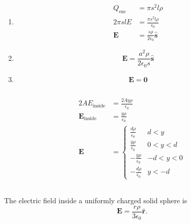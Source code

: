 \documentclass{article}
\renewcommand{\vec}[1]{\boldsymbol{\mathbf{#1}}}
\newcommand{\uvec}[1]{\hat{\vec{#1}}}
\begin{document}
\subsection{}

\begin{enumerate}
  \item

        \begin{align*}
          Q_\text{enc} & = \pi s^2 l \rho                       \\
          2 \pi s l E  & = \frac{\pi s^2 l \rho}{\epsilon_0}    \\
          \vec{E}      & = \frac{s \rho}{2 \epsilon_0} \uvec{s}
        \end{align*}

  \item \[\vec{E} = \frac{a^2 \rho}{2 \epsilon_0 s} \uvec{s}\]

  \item \[\vec{E} = \vec{0}\]
\end{enumerate}

\subsection{}

\begin{align*}
  2 A E_\text{inside}   & = \frac{2 A y \rho}{\epsilon_0}           \\
  \vec{E}_\text{inside} & = \frac{y \rho}{\epsilon_0}               \\
  \vec{E}               & = \begin{cases}
                              \frac{d \rho}{\epsilon_0}  & d < y      \\
                              \frac{y \rho}{\epsilon_0}  & 0 < y < d  \\
                              -\frac{y \rho}{\epsilon_0} & -d < y < 0 \\
                              -\frac{d \rho}{\epsilon_0} & y < -d
                            \end{cases}
\end{align*}

\subsection{}

The electric field inside a uniformly charged solid sphere is \[\vec{E} = \frac{r \rho}{3 \epsilon_0} \uvec{r}.\]
\end{document}
